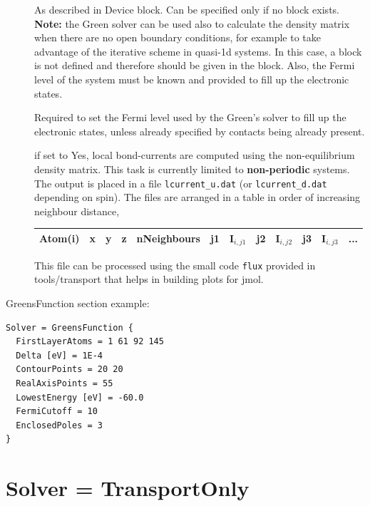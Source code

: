 \begin{description}
\item[] As described in Device block. Can be specified only
  if no  block exists.  {\bf Note:} the Green solver can be used
  also to calculate the density matrix when there are no open boundary
  conditions, for example to take advantage of the iterative scheme in quasi-1d
  systems. In this case, a  block is not defined and therefore
   should be given in the  block. Also,
  the Fermi level of the system must be known and provided to fill up the
  electronic states.

\item[] Required to set the Fermi level
  used by the Green's solver to fill up the electronic states, unless already
  specified by contacts being already present.

\item[] if set to Yes, local bond-currents are computed using
  the non-equilibrium density matrix.  This task is currently limited to
  \textbf{non-periodic} systems. The output is placed in a file
  \verb|lcurrent_u.dat| (or \verb|lcurrent_d.dat| depending on spin).  The files
  are arranged in a table in order of increasing neighbour distance,

\begin{tabular}{|c|c|c|c|c|c|c|c|c|c|c|c|}
  \hline
  Atom(i) & x & y & z &  nNeighbours &  j1 & I$_{i,j1}$ & j2 & I$_{i,j2}$ &  j3 & I$_{i,j3}$ & ...\\
  \hline
\end{tabular}

  This file can be processed using the small code \verb|flux| provided in
  tools/transport that helps in building plots for jmol.
\end{description}

GreensFunction section example:

\begin{verbatim}
Solver = GreensFunction {
  FirstLayerAtoms = 1 61 92 145
  Delta [eV] = 1E-4
  ContourPoints = 20 20
  RealAxisPoints = 55
  LowestEnergy [eV] = -60.0
  FermiCutoff = 10
  EnclosedPoles = 3
}
\end{verbatim}


\section{Solver = TransportOnly}

